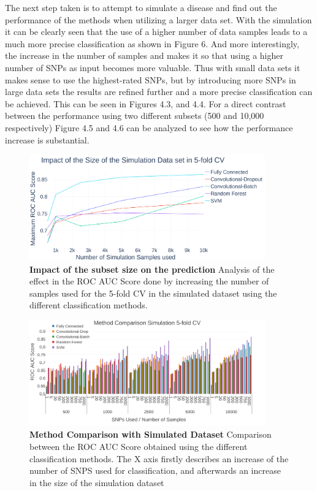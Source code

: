 The next step taken is to attempt to simulate a disease and find out the performance of the methods when utilizing a larger data set. With the simulation it can be clearly seen that the use of a higher number of data samples leads to a much more precise classification as shown in Figure 6. And more interestingly, the increase in the number of samples and makes it so that using a higher number of SNPs as input becomes more valuable. Thus with small data sets it makes sense to use the highest-rated SNPs, but by introducing more SNPs in large data sets the results are refined further and a more precise classification can be achieved. This can be seen in Figures 4.3, and 4.4. For a direct contrast between the performance using two different subsets (500 and 10,000 respectively) Figure 4.5 and 4.6 can be analyzed to see how the performance increase is substantial.


\begin{figure}[!ht]
\centerline{\includegraphics[width=4in]{images/results/ImpactSim.png}}
\caption{{\bf Impact of the subset size on the prediction}
Analysis of the effect in the ROC AUC Score done by increasing the number of samples used for the 5-fold CV in the simulated dataset using the different classification methods.}
\label{fig6}
\end{figure}

\begin{figure}[!ht]
\centerline{\includegraphics[width=4in]{images/results/SimComplete.png}}
\caption{{\bf Method Comparison with Simulated Dataset}
Comparison between the ROC AUC Score obtained using the different classification methods. The X axis firstly describes an increase of the number of SNPS used for classification, and afterwards an increase in the size of the simulation dataset}
\label{fig7}
\end{figure}


